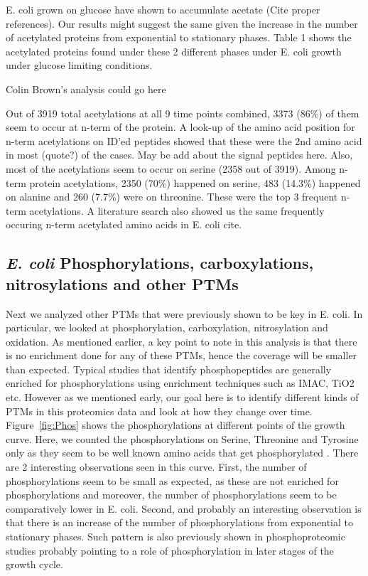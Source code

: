\documentclass[12pt]{article}
\begin{document}
E. coli grown on glucose have shown to accumulate acetate (Cite proper references). Our results might suggest the same given the increase in the number of acetylated proteins from exponential to stationary phases. Table 1 shows the acetylated proteins found under these 2 different phases under E. coli growth under glucose limiting conditions.

{Colin Brown's analysis could go here}


Out of 3919 total acetylations at all 9 time points combined, 3373 (86\%) of them seem to occur at n-term of the protein. A look-up of the amino acid position for n-term acetylations on ID'ed peptides showed that these were the 2nd amino acid in most (quote?) of the cases. {May be add about the signal peptides here}. Also, most of the acetylations seem to occur on serine (2358 out of 3919). Among n-term protein acetylations, 2350 (70\%) happened on serine, 483 (14.3\%) happened on alanine and 260 (7.7\%) were on threonine. These were the top 3 frequent n-term acetylations. A literature search also showed us the same frequently occuring n-term acetylated amino acids in E. coli {cite}.


\subsection{\emph{E. coli} Phosphorylations, carboxylations, nitrosylations and other PTMs}

Next we analyzed other PTMs that were previously shown to be key in E. coli. In particular, we looked at phosphorylation, carboxylation, nitrosylation and oxidation. As mentioned earlier, a key point to note in this analysis is that there is no enrichment done for any of these PTMs, hence the coverage will be smaller than expected. Typical studies that identify phosphopeptides are generally enriched for phosphorylations using enrichment techniques such as IMAC, TiO2 etc. However as we mentioned early, our goal here is to identify different kinds of PTMs in this proteomics data and look at how they change over time. Figure~\ref{fig:Phos} shows the phosphorylations at different points of the growth curve. Here, we counted the phosphorylations on Serine, Threonine and Tyrosine only as they seem to be well known amino acids that get phosphorylated \cite{Maceketal2008}. There are 2 interesting observations seen in this curve. First, the number of phosphorylations seem to be small as expected, as these are not enriched for phosphorylations and moreover, the number of phosphorylations seem to be comparatively lower in E. coli. Second, and probably an interesting observation is that there is an increase of the number of phosphorylations from exponential to stationary phases. Such pattern is also previously shown in phosphoproteomic studies \cite{Soaresetal2013} probably pointing to a role of phosphorylation in later stages of the growth cycle.
\end{document}
